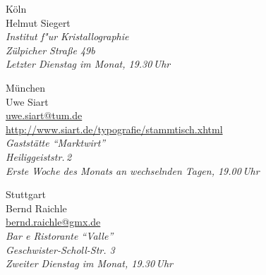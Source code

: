 \begin{multicols}{2}
\begin{roll}
\iffalse
  \item[Kiel]  \ \\
     Karsten Heymann\\
     \url{karsten.heymann@gmx.de}\\
     \emph{Letzter Donnerstag im Monat, 19.00\, Uhr\\
           Ort siehe \url{http://zaubberer.net/latexwiki}}
\fi
  \item[Köln] \ \\
    Helmut Siegert\\
    \emph{Institut f"ur Kristallographie\\
      Zülpicher Straße 49b\\
      Letzter Dienstag im Monat,
      19.30\,Uhr}
%
  \item[München]  \ \\
    Uwe Siart\\
    \url{uwe.siart@tum.de}\\
    \url{http://www.siart.de/typografie/stammtisch.xhtml}\\
    \emph{Gaststätte "`Marktwirt"'\\
	Heiliggeiststr.\,2  \\
	    Erste Woche des Monats an wechselnden Tagen, 19.00\,Uhr}
%
%
%
%
  \item[Stuttgart]  \ \\\nopagebreak
    Bernd Raichle\\
    \url{bernd.raichle@gmx.de}\\
    \emph{Bar e Ristorante "`Valle"'\\
      Geschwister-Scholl-Str. 3\\
      Zweiter Dienstag im Monat, 19.30\,Uhr}


\end{roll}
\end{multicols}
